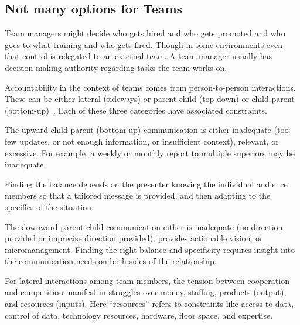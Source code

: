 \subsection*{Not many options for Teams}

Team managers might decide who gets hired and who gets promoted and who goes to what training and who gets fired. Though in some environments even that control is relegated to an external team. A team manager usually has decision making authority regarding tasks the team works on. 

Accountability in the context of teams comes from person-to-person interactions. These can be either lateral (sideways) or parent-child (top-down) or child-parent (bottom-up)~\cite{2014_Jorgensen}. Each of these three categories have associated constraints.

The upward child-parent (bottom-up) communication is either inadequate (too few updates, or not enough information, or insufficient context), relevant, or excessive. For example, a weekly or monthly report to multiple superiors may be inadequate. 

Finding the balance depends on the presenter knowing the individual audience members so that a tailored message is provided, and then adapting to the specifics of the situation. 

The downward parent-child communication either is inadequate (no direction provided or imprecise direction provided), provides actionable vision, or micromanagement. Finding the right balance and specificity requires insight into the communication needs on both sides of the relationship. 

For lateral interactions among team members, the tension between cooperation and competition manifest in struggles over money, staffing, products (output), and resources (inputs). Here ``resources''  refers to constraints like access to data, control of data, technology resources, hardware, floor space, and expertise. 


